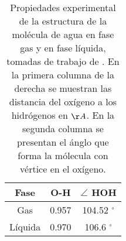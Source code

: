 \begin{table}[h!]
\centering
\caption{\footnotesize Propiedades experimental de la estructura de 
la mol\'ecula de agua en fase gas y en fase l\'iquida, tomadas de 
trabajo de \cite{Mori1997}. En la primera columna de la derecha se
muestran las distancia del ox\'igeno a los hidr\'ogenos en $\AA$. En
la segunda columna se presentan el \'anglo que forma la m\'olecula 
con v\'ertice en el ox\'igeno.}
\begin{tabular}{c|cc}\hline\hline
Fase      & O-H & $\angle$ HOH \\ \hline
Gas       & 0.957 & 104.52 $^{\circ}$ \\ 
L\'iquida & 0.970 & 106.6  $^{\circ}$ \\ 
\hline \end{tabular}\label{tsf1}\end{table}


